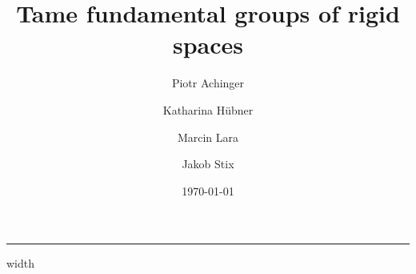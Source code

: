 \documentclass[a4paper,twoside,11pt,reqno]{amsart}
\theoremstyle{definition}
\numberwithin{equation}{subsection}
\begin{document}
\hrule width\hsize
\vskip 1cm

\title{Tame fundamental groups of rigid spaces} 

\author{Piotr Achinger}
\address{Piotr Achinger
\newline \indent
Instytut Matematyczny PAN, Śniadeckich 8, 00-656 Warsaw, Poland 
\newline \indent
Kyiv School of Economics, Shpaka 3, 02-000 Kyiv, Ukraine}

\author{Katharina H\"ubner}
\address{Katharina H\"ubner
\newline \indent
Institut f\"ur Mathematik, Goethe--Universit\"at Frankfurt 
\newline \indent
Robert-Mayer-Stra\ss e~6--8, 60325~Frankfurt am Main, Germany}

\author{Marcin Lara}
\address{Marcin Lara
\newline \indent
Instytut Matematyczny PAN, Śniadeckich 8, 00-656 Warsaw, Poland}

\author{Jakob Stix}
\address{Jakob Stix
\newline \indent
Institut f\"ur Mathematik, Goethe--Universit\"at Frankfurt
\newline \indent
Robert-Mayer-Str.~6--8, 60325~Frankfurt am Main, Germany}

\newcommand{\grants}{The first author (PA) was supported by the project KAPIBARA funded by the European Research Council (ERC) under the European Union's Horizon 2020 research and innovation programme (grant agreement No 802787). The second to fourth authors (KH, ML, and JS) acknowledge support by Deutsche Forschungsgemeinschaft (DFG) through the Collaborative Research Centre TRR 326 \emph{Geometry and Arithmetic of Uniformized Structures} project number 444845124. The third author (ML) was later supported by the National Science Centre, Poland, grant number 2023/51/D/ST1/02294. For the purpose of Open Access, the author has applied a CC-BY public copyright licence to any Author Accepted Manuscript (AAM) version arising from this submission.}

\date{\today} 

\maketitle
\end{document}
